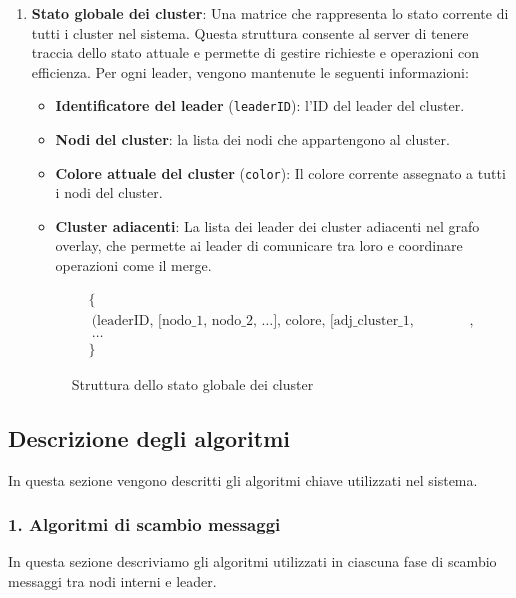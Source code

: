 \documentclass[12pt, a4paper]{report}
\begin{document}
\begin{enumerate}
    \item \textbf{Stato globale dei cluster}: Una matrice che rappresenta lo stato corrente di tutti i cluster nel sistema. Questa struttura consente al server di tenere traccia dello stato attuale e permette di gestire richieste e operazioni con efficienza. Per ogni leader, vengono mantenute le seguenti informazioni:
    \begin{itemize}
        \item \textbf{Identificatore del leader} (\texttt{leaderID}): l'ID del leader del cluster.
        \item \textbf{Nodi del cluster}: la lista dei nodi che appartengono al cluster.
        \item \textbf{Colore attuale del cluster} (\texttt{color}): Il colore corrente assegnato a tutti i nodi del cluster.
        \item \textbf{Cluster adiacenti}: La lista dei leader dei cluster adiacenti nel grafo overlay, che permette ai leader di comunicare tra loro e coordinare operazioni come il merge.
    \end{itemize}
    \vspace{-20pt}
    \begin{figure}[H]
    \begin{align*}
            &\{ \\
            &\ \text{(leaderID, [nodo\_1, nodo\_2, \ldots], colore, [adj\_cluster\_1, adj\_cluster\_2, \ldots])}, \\
            &\ \ldots \\
            &\}
        \end{align*}
        \vspace{-20pt}
        \caption{Struttura dello stato globale dei cluster}
        \label{fig:global_cluster_state}
    \end{figure}

\end{enumerate}

\subsection{Descrizione degli algoritmi}

In questa sezione vengono descritti gli algoritmi chiave utilizzati nel sistema.

\subsubsection{1. Algoritmi di scambio messaggi}
\label{subsec:scambio_messaggi}
In questa sezione descriviamo gli algoritmi utilizzati in ciascuna fase di scambio messaggi tra nodi interni e leader.
\end{document}
